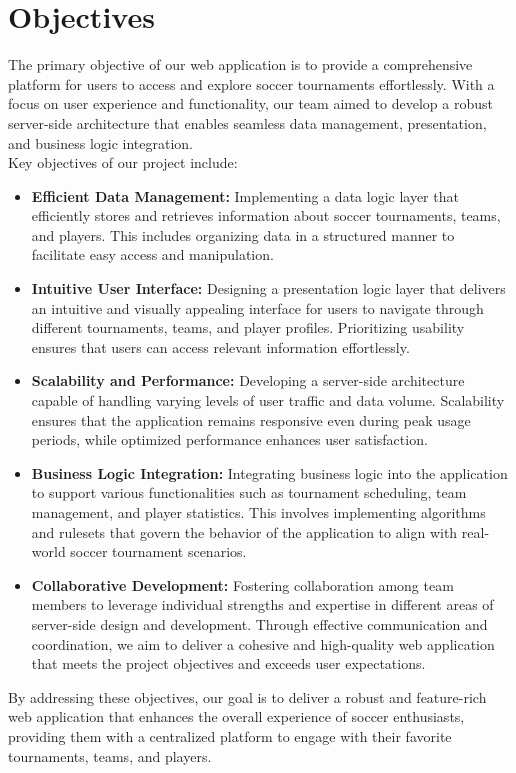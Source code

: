 \section{Objectives}

The primary objective of our web application is to provide a comprehensive platform for users to access and explore soccer tournaments effortlessly. With a focus on user experience and functionality, our team aimed to develop a robust server-side architecture that enables seamless data management, presentation, and business logic integration. \\
Key objectives of our project include:

\begin{itemize}
    \item \textbf{Efficient Data Management:} Implementing a data logic layer that efficiently stores and retrieves information about soccer tournaments, teams, and players. This includes organizing data in a structured manner to facilitate easy access and manipulation.
    \item \textbf{Intuitive User Interface:} Designing a presentation logic layer that delivers an intuitive and visually appealing interface for users to navigate through different tournaments, teams, and player profiles. Prioritizing usability ensures that users can access relevant information effortlessly.
    \item \textbf{Scalability and Performance:} Developing a server-side architecture capable of handling varying levels of user traffic and data volume. Scalability ensures that the application remains responsive even during peak usage periods, while optimized performance enhances user satisfaction.
    \item \textbf{Business Logic Integration:} Integrating business logic into the application to support various functionalities such as tournament scheduling, team management, and player statistics. This involves implementing algorithms and rulesets that govern the behavior of the application to align with real-world soccer tournament scenarios.
    \item \textbf{Collaborative Development:} Fostering collaboration among team members to leverage individual strengths and expertise in different areas of server-side design and development. Through effective communication and coordination, we aim to deliver a cohesive and high-quality web application that meets the project objectives and exceeds user expectations.
\end{itemize}
By addressing these objectives, our goal is to deliver a robust and feature-rich web application that enhances the overall experience of soccer enthusiasts, providing them with a centralized platform to engage with their favorite tournaments, teams, and players.